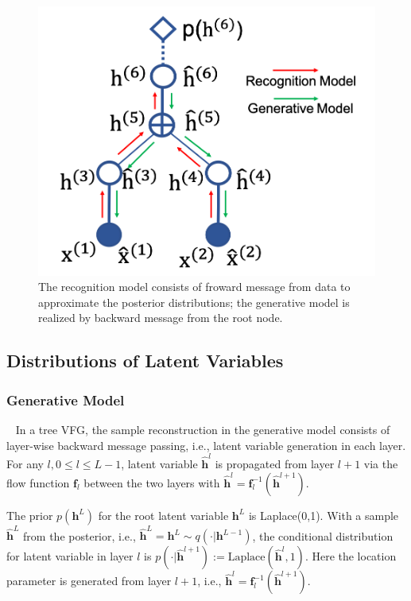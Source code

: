 \documentclass{article}
\begin{document}
\begin{figure}[H]
\begin{center}
 \includegraphics[width=0.4\linewidth]{fig/tree_message2.png}
\end{center}
\vspace{-0.2in}
\caption{ The recognition model consists of froward message from  data to approximate the posterior distributions; the generative model is realized by backward message from the root node. }
\label{fig:tree_message2}
\vspace{-0.15in}
\end{figure}



\subsection{Distributions of Latent Variables}


\subsubsection{Generative Model}~\label{sec:generative}
In a tree VFG, the sample reconstruction in the generative model consists of layer-wise backward message passing, i.e., latent variable generation in each layer.  For any $l, 0 \leq l \leq L-1$, latent variable $\widehat{\mathbf{h}}^{l}$ is propagated   from layer $l+1$ via the flow function $\mathbf{f}_l$ between the two layers with $\widehat{\mathbf{h}}^{l}= \mathbf{f}_l^{-1}(\widehat{\mathbf{h}}^{l+1})$. 


The prior $p(\mathbf{h}^L)$ for the root latent variable $\mathbf{h}^L$ is  Laplace(0,1). With a sample $\widehat{\mathbf{h}}^L$ from the posterior, i.e., $\widehat{\mathbf{h}}^L=\mathbf{h}^L \sim q(\cdot | \mathbf{h}^{L-1}) $,  the conditional distribution for latent variable in layer $l$ is   $p(\cdot | \widehat{\mathbf{h}}^{l+1}):=\text{Laplace}(\widehat{\mathbf{h}}^l, 1)$. Here the location parameter is generated from layer $l+1$, i.e., $\widehat{\mathbf{h}}^{l}= \mathbf{f}_l^{-1}(\widehat{\mathbf{h}}^{l+1})$. 
\end{document}
